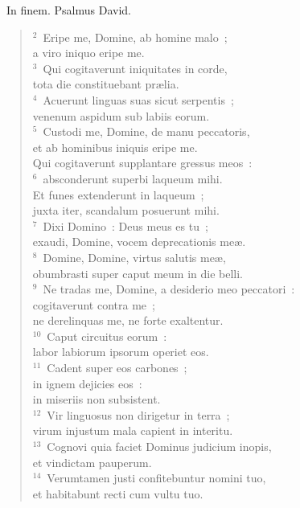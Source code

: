 ~\lettrine[lines=10,image=true,loversize=0.05,lraise=-0.03]{I}{}n finem. Psalmus David.
\begin{flushleft}\begin{verse}\vspace{6pt}${}^{2}$~Eripe me, Domine, ab homine malo~;\\ a viro iniquo eripe me.\\
${}^{3}$~Qui cogitaverunt iniquitates in corde,\\ tota die constituebant pr\ae lia.\\
${}^{4}$~Acuerunt linguas suas sicut serpentis~;\\ venenum aspidum sub labiis eorum.\\
${}^{5}$~Custodi me, Domine, de manu peccatoris,\\ et ab hominibus iniquis eripe me.\\ Qui cogitaverunt supplantare gressus meos~:\\
${}^{6}$~absconderunt superbi laqueum mihi.\\ Et funes extenderunt in laqueum~;\\ juxta iter, scandalum posuerunt mihi.\\
${}^{7}$~Dixi Domino~: Deus meus es tu~;\\ exaudi, Domine, vocem deprecationis me\ae .\\
${}^{8}$~Domine, Domine, virtus salutis me\ae ,\\ obumbrasti super caput meum in die belli.\\
${}^{9}$~Ne tradas me, Domine, a desiderio meo peccatori~:\\ cogitaverunt contra me~;\\ ne derelinquas me, ne forte exaltentur.\\
${}^{10}$~Caput circuitus eorum~:\\ labor labiorum ipsorum operiet eos.\\
${}^{11}$~Cadent super eos carbones~;\\ in ignem dejicies eos~:\\ in miseriis non subsistent.\\
${}^{12}$~Vir linguosus non dirigetur in terra~;\\ virum injustum mala capient in interitu.\\
${}^{13}$~Cognovi quia faciet Dominus judicium inopis,\\ et vindictam pauperum.\\
${}^{14}$~Verumtamen justi confitebuntur nomini tuo,\\ et habitabunt recti cum vultu tuo.\end{verse}\end{flushleft}


